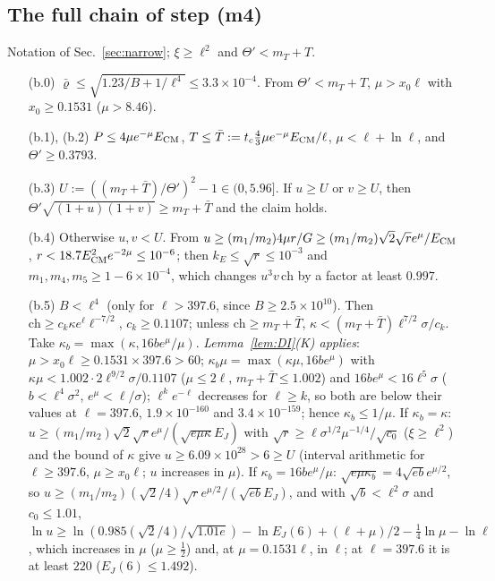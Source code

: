 \subsection{The full chain of step (m4)}

Notation of Sec.~\ref{sec:narrow}; $\xi\ge\ell^2$ and $\Theta'<m_T+T$.
\begin{itemize}
\item[(b.0)] $\bar\varrho\le\sqrt{1.23/B+1/\ell^4}\le3.3\times10^{-4}$. From $\Theta'<m_T+T$, $\mu>x_0\ell$ with $x_0\ge0.1531$ ($\mu>8.46$).
\item[(b.1), (b.2)] $P\le4\mu e^{-\mu}E_{\rm CM}$, $T\le\bar T:=t_c\frac43\mu e^{-\mu}E_{\rm CM}/\ell$, $\mu<\ell+\ln\ell$, and $\Theta'\ge0.3793$.
\item[(b.3)] $U:=((m_T+\bar T)/\Theta')^2-1\in(0,5.96]$. If $u\ge U$ or $v\ge U$, then $\Theta'\sqrt{(1+u)(1+v)}\ge m_T+\bar T$ and the claim holds.
\item[(b.4)] Otherwise $u,v<U$. From $u\ge(m_1/m_2)4\mu r/G\ge(m_1/m_2)\sqrt2\sqrt re^{\mu}/E_{\rm CM}$, $r<18.7E_{\rm CM}^2e^{-2\mu}\le10^{-6}$; then $k_E\le\sqrt r\le10^{-3}$ and $m_1,m_4,m_5\ge1-6\times10^{-4}$, which changes $u^3v\,\mathrm{ch}$ by a factor at least $0.997$.
\item[(b.5)] $B<\ell^4$ (only for $\ell>397.6$, since $B\ge2.5\times10^{10}$). Then $\mathrm{ch}\ge c_k\kappa e^\ell\ell^{-7/2}$, $c_k\ge0.1107$; unless $\mathrm{ch}\ge m_T+\bar T$, $\kappa<(m_T+\bar T)\ell^{7/2}\sigma/c_k$. Take $\kappa_b=\max(\kappa,16be^{\mu}/\mu)$.
\emph{Lemma~\ref{lem:DI}(K) applies}: $\mu>x_0\ell\ge0.1531\times397.6>60$; $\kappa_b\mu=\max(\kappa\mu,16be^\mu)$ with $\kappa\mu<1.002\cdot2\ell^{9/2}\sigma/0.1107$ ($\mu\le2\ell$, $m_T+\bar T\le1.002$) and $16be^\mu<16\ell^5\sigma$ ($b<\ell^4\sigma^2$, $e^\mu<\ell/\sigma$); $\ell^ke^{-\ell}$ decreases for $\ell\ge k$, so both are below their values at $\ell=397.6$, $1.9\times10^{-160}$ and $3.4\times10^{-159}$; hence $\kappa_b\le1/\mu$.
If $\kappa_b=\kappa$: $u\ge(m_1/m_2)\sqrt2\sqrt re^{\mu}/(\sqrt{e\mu\kappa}E_J)$ with $\sqrt r\ge\ell\sigma^{1/2}\mu^{-1/4}/\sqrt{c_0}$ ($\xi\ge\ell^2$) and the bound of $\kappa$ give $u\ge6.09\times10^{28}>6\ge U$ (interval arithmetic for $\ell\ge397.6$, $\mu\ge x_0\ell$; $u$ increases in $\mu$).
If $\kappa_b=16be^\mu/\mu$: $\sqrt{e\mu\kappa_b}=4\sqrt{eb}e^{\mu/2}$, so $u\ge(m_1/m_2)(\sqrt2/4)\sqrt re^{\mu/2}/(\sqrt{eb}E_J)$, and with $\sqrt b<\ell^2\sigma$ and $c_0\le1.01$,
$\ln u\ge\ln(0.985(\sqrt2/4)/\sqrt{1.01e})-\ln E_J(6)+(\ell+\mu)/2-\frac14\ln\mu-\ln\ell$, which increases in $\mu$ ($\mu\ge\frac12$) and, at $\mu=0.1531\ell$, in $\ell$; at $\ell=397.6$ it is at least $220$ ($E_J(6)\le1.492$).

\end{itemize}

